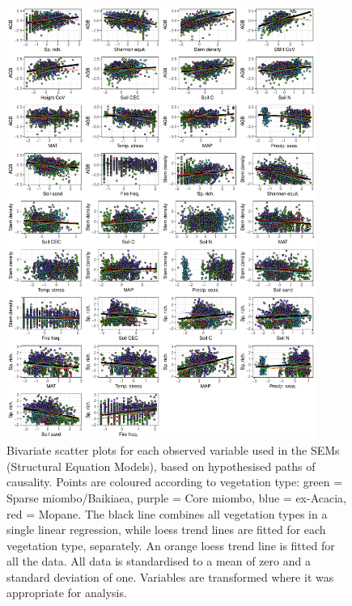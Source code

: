 \begin{refsection}
\begin{supplement}
\begin{figure}[tb]
\centering
	\includegraphics[width=0.9\textwidth]{img/bivar_lm}
	\caption[Bivariate scatter plots of observed variables]{Bivariate scatter plots for each observed variable used in the SEMs (Structural Equation Models), based on hypothesised paths of causality. Points are coloured according to vegetation type: green = Sparse miombo/Baikiaea, purple = Core miombo, blue = ex-Acacia, red = Mopane. The black line combines all vegetation types in a single linear regression, while loess trend lines are fitted for each vegetation type, separately. An orange loess trend line is fitted for all the data. All data is standardised to a mean of zero and a standard deviation of one. Variables are transformed where it was appropriate for analysis.}
	\label{befr:bivar_lm}
\end{figure}


\end{supplement}
\end{refsection}
